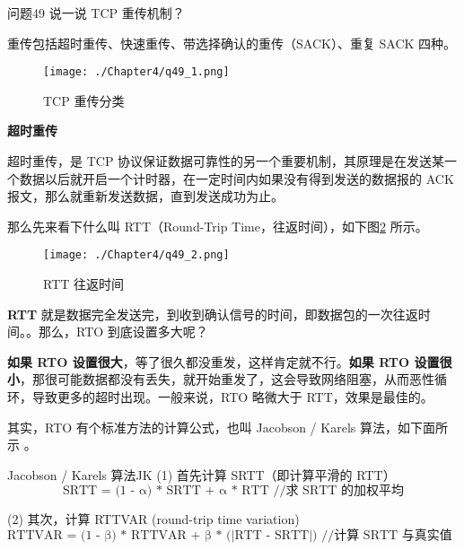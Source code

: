\documentclass[cn,11pt,color=blue,lang=cn]{elegantbook}
\begin{document}
\begin{custom}{问题49}
说一说 TCP 重传机制？
\end{custom}
\begin{solution}
重传包括超时重传、快速重传、带选择确认的重传（SACK）、重复 SACK 四种。
\begin{figure}[!h]
\centering
\texttt{[image: ./Chapter4/q49\_1.png]}
\caption{TCP 重传分类}
\label{fig49_1}
\end{figure}

\newpage
\begin{note} \textbf{超时重传} \end{note}

超时重传，是 TCP 协议保证数据可靠性的另一个重要机制，其原理是在发送某一个数据以后就开启一个计时器，在一定时间内如果没有得到发送的数据报的 ACK 报文，那么就重新发送数据，直到发送成功为止。

那么先来看下什么叫 RTT（Round-Trip Time，往返时间），如下图\ref{fig49_2} 所示。

\begin{figure}[!h]
\centering
\texttt{[image: ./Chapter4/q49\_2.png]}
\caption{RTT 往返时间}
\label{fig49_2}
\end{figure}

\textbf{RTT} 就是数据完全发送完，到收到确认信号的时间，即数据包的一次往返时间。。那么，RTO 到底设置多大呢？

\textbf{如果 RTO 设置很大}，等了很久都没重发，这样肯定就不行。\textbf{如果 RTO 设置很小}，那很可能数据都没有丢失，就开始重发了，这会导致网络阻塞，从而恶性循环，导致更多的超时出现。一般来说，RTO 略微大于 RTT，效果是最佳的。

其实，RTO 有个标准方法的计算公式，也叫 Jacobson / Karels 算法，如下面所示 。

\begin{myDefinition}{Jacobson / Karels 算法}{JK}
(1) 首先计算 SRTT（即计算平滑的 RTT）
\begin{equation}
   \label{eq:1}
   \text{SRTT = (1 - α) * SRTT + α * RTT  //求 SRTT 的加权平均}
\end{equation}

(2) 其次，计算 RTTVAR (round-trip time variation)
\begin{equation}
   \label{eq:2}
   \text{RTTVAR = (1 - β) * RTTVAR + β * (|RTT - SRTT|) //计算 SRTT 与真实值的差距}
\end{equation}


\end{myDefinition}
\end{solution}
\end{document}
